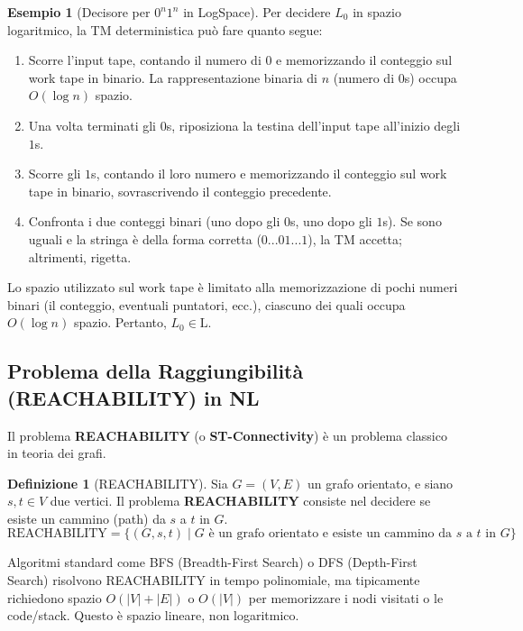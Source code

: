 \documentclass[a4paper]{article}
\theoremstyle{definition} %
\newtheorem{definition}{Definizione}[section]
\newtheorem{example}{Esempio}[section]
\begin{document}
\begin{example}[Decisore per $0^n1^n$ in LogSpace]
Per decidere $L_0$ in spazio logaritmico, la TM deterministica può fare quanto segue:
\begin{enumerate}
    \item Scorre l'input tape, contando il numero di $0$ e memorizzando il conteggio sul work tape in binario. La rappresentazione binaria di $n$ (numero di $0$s) occupa $O(\log n)$ spazio.
    \item Una volta terminati gli $0$s, riposiziona la testina dell'input tape all'inizio degli $1$s.
    \item Scorre gli $1$s, contando il loro numero e memorizzando il conteggio sul work tape in binario, sovrascrivendo il conteggio precedente.
    \item Confronta i due conteggi binari (uno dopo gli $0$s, uno dopo gli $1$s). Se sono uguali e la stringa è della forma corretta ($0...01...1$), la TM accetta; altrimenti, rigetta.
\end{enumerate}
Lo spazio utilizzato sul work tape è limitato alla memorizzazione di pochi numeri binari (il conteggio, eventuali puntatori, ecc.), ciascuno dei quali occupa $O(\log n)$ spazio. Pertanto, $L_0 \in \text{L}$.
\end{example}

\subsection{Problema della Raggiungibilità (REACHABILITY) in NL}

Il problema \textbf{REACHABILITY} (o \textbf{ST-Connectivity}) è un problema classico in teoria dei grafi.

\begin{definition}[REACHABILITY]
Sia $G=(V,E)$ un grafo orientato, e siano $s, t \in V$ due vertici. Il problema \textbf{REACHABILITY} consiste nel decidere se esiste un cammino (path) da $s$ a $t$ in $G$.
\[ \text{REACHABILITY} = \{ (G, s, t) \mid G \text{ è un grafo orientato e esiste un cammino da } s \text{ a } t \text{ in } G \} \]
\end{definition}

Algoritmi standard come BFS (Breadth-First Search) o DFS (Depth-First Search) risolvono REACHABILITY in tempo polinomiale, ma tipicamente richiedono spazio $O(|V| + |E|)$ o $O(|V|)$ per memorizzare i nodi visitati o le code/stack. Questo è spazio lineare, non logaritmico.
\end{document}
